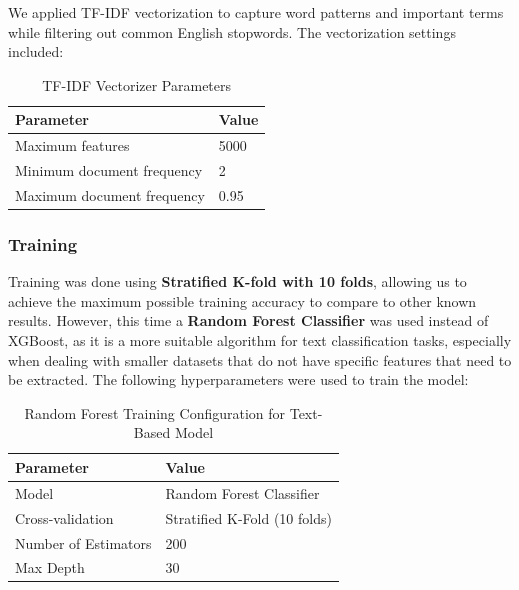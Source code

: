 \documentclass{article}
\begin{document}
We applied TF-IDF vectorization to capture word patterns and important terms while filtering out common English stopwords. The vectorization settings included:

\begin{table}[H]
\renewcommand{\arraystretch}{1.3}
\setlength{\tabcolsep}{11pt}
\centering
\begin{tabular}{|p{6cm}|p{8.5cm}|}
\hline
\textbf{Parameter} & \textbf{Value} \\
\hline
Maximum features & 5000 \\
\hline
Minimum document frequency & 2 \\
\hline
Maximum document frequency & 0.95 \\
\hline
\end{tabular}
\caption{TF-IDF Vectorizer Parameters}
\label{tab:tfidf_params}
\end{table}


\subsubsection*{Training}
\noindent
Training was done using \textbf{Stratified K-fold with 10 folds}, allowing us to achieve the maximum possible training accuracy to compare to other known results. However, this time a \textbf{Random Forest Classifier} was used instead of XGBoost, as it is a more suitable algorithm for text classification tasks, especially when dealing with smaller datasets that do not have specific features that need to be extracted. The following hyperparameters were used to train the model:


\begin{table}[h!]
    \centering
    \renewcommand{\arraystretch}{1.2}
    \setlength{\tabcolsep}{11pt}
    \begin{tabular}{|l|l|}
        \hline
        \textbf{Parameter} & \textbf{Value} \\
        \hline
        Model & Random Forest Classifier \\
        \hline
        Cross-validation & Stratified K-Fold (10 folds) \\
        \hline
        Number of Estimators & 200 \\
        \hline
        Max Depth & 30 \\
        \hline
    \end{tabular}
    \caption{Random Forest Training Configuration for Text-Based Model}
\end{table}
\end{document}
